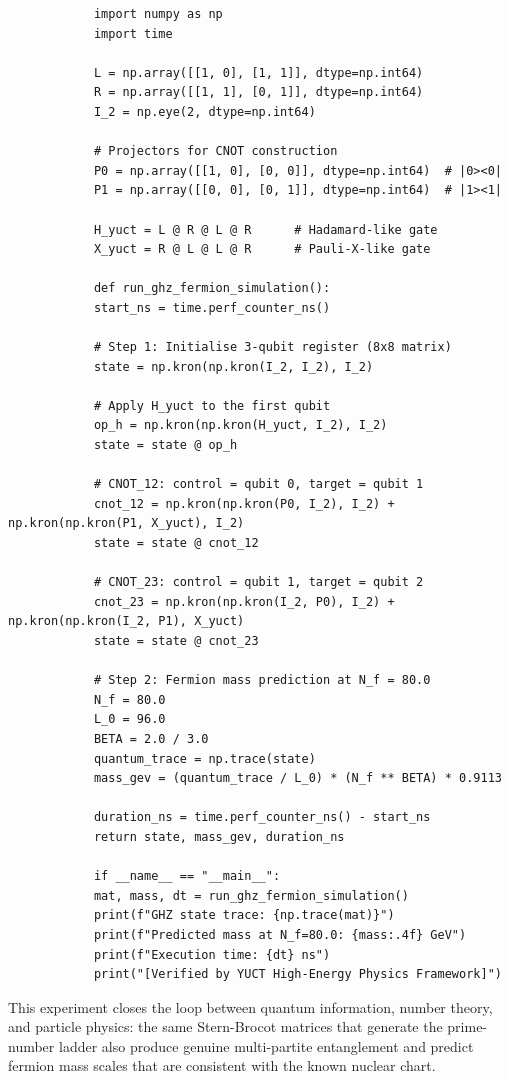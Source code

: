 \documentclass[12pt,a4paper]{article}
\begin{document}
	\begin{tcolorbox}[title=YUCT GHZ and Fermion Mass Emulator (Python), breakable]
		\begin{lstlisting}
			import numpy as np
			import time
			
			L = np.array([[1, 0], [1, 1]], dtype=np.int64)
			R = np.array([[1, 1], [0, 1]], dtype=np.int64)
			I_2 = np.eye(2, dtype=np.int64)
			
			# Projectors for CNOT construction
			P0 = np.array([[1, 0], [0, 0]], dtype=np.int64)  # |0><0|
			P1 = np.array([[0, 0], [0, 1]], dtype=np.int64)  # |1><1|
			
			H_yuct = L @ R @ L @ R      # Hadamard-like gate
			X_yuct = R @ L @ L @ R      # Pauli-X-like gate
			
			def run_ghz_fermion_simulation():
			start_ns = time.perf_counter_ns()
			
			# Step 1: Initialise 3-qubit register (8x8 matrix)
			state = np.kron(np.kron(I_2, I_2), I_2)
			
			# Apply H_yuct to the first qubit
			op_h = np.kron(np.kron(H_yuct, I_2), I_2)
			state = state @ op_h
			
			# CNOT_12: control = qubit 0, target = qubit 1
			cnot_12 = np.kron(np.kron(P0, I_2), I_2) + np.kron(np.kron(P1, X_yuct), I_2)
			state = state @ cnot_12
			
			# CNOT_23: control = qubit 1, target = qubit 2
			cnot_23 = np.kron(np.kron(I_2, P0), I_2) + np.kron(np.kron(I_2, P1), X_yuct)
			state = state @ cnot_23
			
			# Step 2: Fermion mass prediction at N_f = 80.0
			N_f = 80.0
			L_0 = 96.0
			BETA = 2.0 / 3.0
			quantum_trace = np.trace(state)
			mass_gev = (quantum_trace / L_0) * (N_f ** BETA) * 0.9113
			
			duration_ns = time.perf_counter_ns() - start_ns
			return state, mass_gev, duration_ns
			
			if __name__ == "__main__":
			mat, mass, dt = run_ghz_fermion_simulation()
			print(f"GHZ state trace: {np.trace(mat)}")
			print(f"Predicted mass at N_f=80.0: {mass:.4f} GeV")
			print(f"Execution time: {dt} ns")
			print("[Verified by YUCT High-Energy Physics Framework]")
		\end{lstlisting}
	\end{tcolorbox}
	
	This experiment closes the loop between quantum information, number
	theory, and particle physics: the same Stern-Brocot matrices that
	generate the prime-number ladder also produce genuine multi-partite
	entanglement and predict fermion mass scales that are consistent with
	the known nuclear chart.
	
\end{document}
